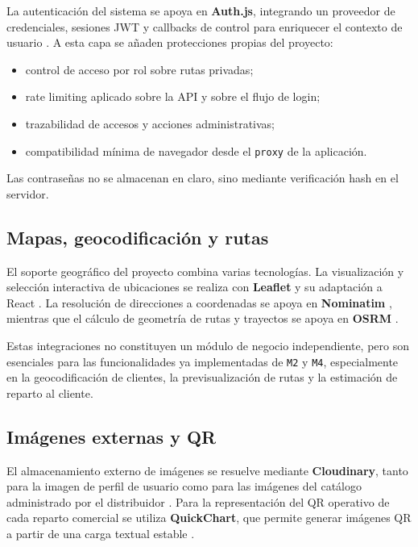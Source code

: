 La autenticación del sistema se apoya en \textbf{Auth.js}, integrando un proveedor de credenciales, sesiones JWT y callbacks de control para enriquecer el contexto de usuario \citep{authjsdocs2026}. A esta capa se añaden protecciones propias del proyecto:

\begin{itemize}
    \item control de acceso por rol sobre rutas privadas;
    \item rate limiting aplicado sobre la API y sobre el flujo de login;
    \item trazabilidad de accesos y acciones administrativas;
    \item compatibilidad mínima de navegador desde el \texttt{proxy} de la aplicación.
\end{itemize}

Las contraseñas no se almacenan en claro, sino mediante verificación hash en el servidor.

\subsection{Mapas, geocodificación y rutas}

El soporte geográfico del proyecto combina varias tecnologías. La visualización y selección interactiva de ubicaciones se realiza con \textbf{Leaflet} y su adaptación a React \citep{leafletdocs2026}. La resolución de direcciones a coordenadas se apoya en \textbf{Nominatim} \citep{nominatimapi2026}, mientras que el cálculo de geometría de rutas y trayectos se apoya en \textbf{OSRM} \citep{osrmdocs2026}.

Estas integraciones no constituyen un módulo de negocio independiente, pero son esenciales para las funcionalidades ya implementadas de \texttt{M2} y \texttt{M4}, especialmente en la geocodificación de clientes, la previsualización de rutas y la estimación de reparto al cliente.

\subsection{Imágenes externas y QR}

El almacenamiento externo de imágenes se resuelve mediante \textbf{Cloudinary}, tanto para la imagen de perfil de usuario como para las imágenes del catálogo administrado por el distribuidor \citep{cloudinaryupload2026}. Para la representación del QR operativo de cada reparto comercial se utiliza \textbf{QuickChart}, que permite generar imágenes QR a partir de una carga textual estable \citep{quickchartqr2026}.

